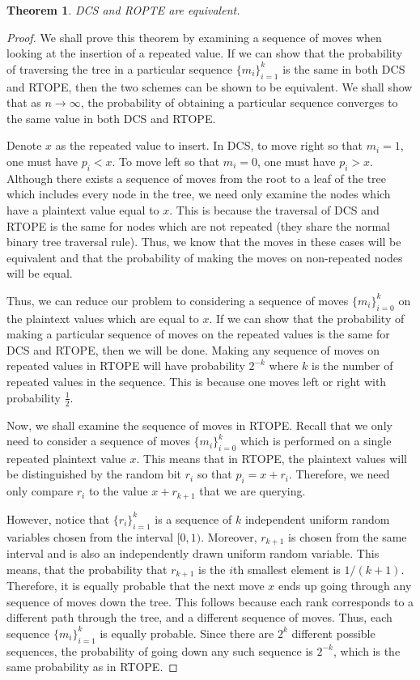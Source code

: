 \documentclass[12pt]{article}
\newtheorem{theorem}{Theorem}[section]
\begin{document}
  \begin{theorem}
    DCS and ROPTE are equivalent.
  \end{theorem}
  \begin{proof}
    We shall prove this theorem by examining a sequence of moves when looking at the insertion of a repeated value. If we can show that the probability of traversing the tree in a particular sequence $\{m_i\}_{i=1}^k$ is the same in both DCS and RTOPE, then the two schemes can be shown to be equivalent. We shall show that as $n \to \infty$, the probability of obtaining a particular sequence converges to the same value in both DCS and RTOPE.

  Denote $x$ as the repeated value to insert. In DCS, to move right so that $m_i = 1$, one must have $p_i < x$. To move left so that $m_i = 0$, one must have $p_i > x$. Although there exists a sequence of moves from the root to a leaf of the tree which includes every node in the tree, we need only examine the nodes which have a plaintext value equal to $x$. This is because the traversal of DCS and RTOPE is the same for nodes which are not repeated (they share the normal binary tree traversal rule). Thus, we know that the moves in these cases will be equivalent and that the probability of making the moves on non-repeated nodes will be equal.

  Thus, we can reduce our problem to considering a sequence of moves $\{m_i\}_{i=0}^k$ on the plaintext values which are equal to $x$. If we can show that the probability of making a particular sequence of moves on the repeated values is the same for DCS and RTOPE, then we will be done. Making any sequence of moves on repeated values in RTOPE will have probability $2^{-k}$ where $k$ is the number of repeated values in the sequence. This is because one moves left or right with probability $\frac{1}{2}$.

  Now, we shall examine the sequence of moves in RTOPE. Recall that we only need to consider a sequence of moves $\{m_i\}_{i=0}^k$ which is performed on a single repeated plaintext value $x$. This means that in RTOPE, the plaintext values will be distinguished by the random bit $r_i$ so that $p_{i} = x + r_i$. Therefore, we need only compare $r_i$ to the value $x + r_{k+1}$ that we are querying. 

  However, notice that $\{r_i\}_{i=1}^k$ is a sequence of $k$ independent uniform random variables chosen from the interval $[0,1)$. Moreover, $r_{k+1}$ is chosen from the same interval and is also an independently drawn uniform random variable. This means, that the probability that $r_{k+1}$ is the $i$th smallest element is $1/(k+1)$. Therefore, it is equally probable that the next move $x$ ends up going through any sequence of moves down the tree. This follows because each rank corresponds to a different path through the tree, and a different sequence of moves. Thus, each sequence $\{m_i\}_{i=1}^k$ is equally probable. Since there are $2^k$ different possible sequences, the probability of going down any such sequence is $2^{-k}$, which is the same probability as in RTOPE.


\end{proof}
\end{document}
